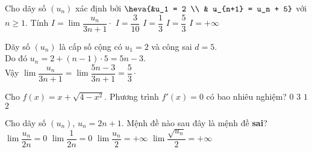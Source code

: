 \begin{ex}%
	Cho dãy số $ \left(u_n \right) $ xác định bởi $ \heva{&u_1 = 2 \\ & u_{n+1} = u_n + 5} $	 với $ n \ge 1 $. Tính $ I = \lim \dfrac{u_n}{3n+ 1} \cdot$
	\choice
	{ $ I = \dfrac{3}{10} $}
	{ $ I = \dfrac{1}{3} $}
	{\True $ I = \dfrac{5}{3} $ }
	{ $ I = +\infty $}	
	\loigiai
	{Dãy số $ \left(u_n \right) $ là cấp số cộng có $ u_1 = 2 $ và công sai $ d = 5 $.\\ Do đó $ u_n = 2 + (n-1) \cdot 5 = 5n - 3. $\\
		Vậy $ \lim \dfrac{u_n}{3n + 1} = \lim \dfrac{5n - 3}{3n+ 1} = \dfrac{5}{3} \cdot $
		
	}
\end{ex}	

\begin{ex}%
Cho $f(x)=x+\sqrt{4-x^2}$. Phương trình $f'(x)=0$ có bao nhiêu nghiệm?
\choice
{$0$}
{$3$}
{\True $1$}
{$2$}
\end{ex}

\begin{ex}%
Cho dãy số $(u_n)$, $u_n=2n+1$. Mệnh đề nào sau đây là mệnh đề \textbf{sai}?
\choice
{\True $\lim \dfrac{u_n}{2n}=0$}
{$\lim \dfrac{1}{2n}=0$}
{$\lim \dfrac{u_n}{2}=+\infty$}
{$\lim \dfrac{\sqrt{u_n}}{2}=+\infty$}
\end{ex}

